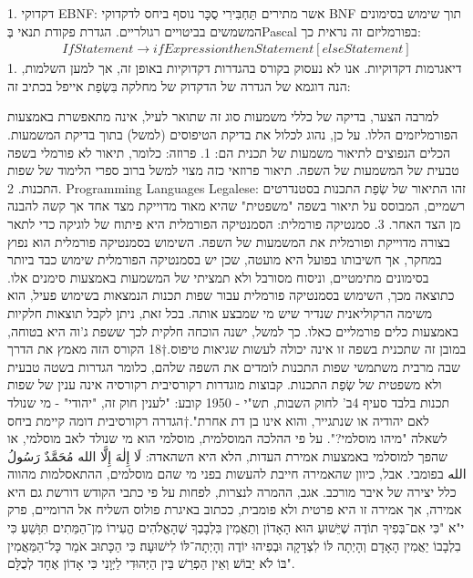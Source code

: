       1. דקדוקי EBNF: אשר מתירים תַּחְבִּירִי סֻכָּר נוסף ביחס לדקדוקי BNF תוך שימוש בסימונים המשמשים בביטויים רגולריים. הגדרת פקודת תנאי בְּPascal בפורמליזם זה נראית כך:
      \begin{align}
      IfStatement → if Expression then Statement [else Statement]
    \end{align}
      1. דיאגרמות דקדוקיות. אנו לא נעסוק בקורס בהגדרות דקדוקיות באופן זה, אך למען השלמות, הנה דוגמא של הגדרה של הדקדוק של מחלקה בִּשְׂפַת אייפל בכתיב זה:

      למרבה הצער, בדיקה של כללי משמעות סוג זה שתואר לעיל, אינה מתאפשרת באמצעות
      הפורמליזמים הללו. על כן, נהוג לכלול את בדיקת הטיפוסים (למשל) בתוך בדיקת
      המשמעות.  הכלים הנפוצים לתיאור משמעות של תכנית הם:
      1. פרוזה: כלומר, תיאור לא פורמלי בשפה טבעית של המשמעות של השפה. תיאור פרוזאי כזה מצוי למשל ברוב ספרי הלימוד של שפות התכנות.
      2. Programming Languages Legalese: זהו התיאור של שְׂפַת התכנות בסטנדרטים רשמיים, המבוסס על תיאור בשפה "משפטית" שהיא מאוד מדוייקת מצד אחד אך קשה להבנה מן הצד האחר.
      3. סמנטיקה פורמלית: הסמנטיקה הפורמלית היא פיתוח של לוגיקה כדי לתאר בצורה מדוייקת ופורמלית את המשמעות של השפה.
      השימוש בסמנטיקה פורמלית הוא נפוץ במחקר, אך חשיבותו בפועל היא מועטה, שכן יש בסמנטיקה הפורמלית שימוש כבד ביותר בסימונים מתימטיים, וניסוח מסורבל ולא תמציתי של המשמעות באמצעות סימנים אלו. כתוצאה מכך, השימוש בסמנטיקה פורמלית עבור שפות תכנות הנמצאות בשימוש פעיל, הוא משימה הרקוליאנית שנדיר שיש מי שמבצע אותה.
      בכל זאת, ניתן לקבל תוצאות חלקיות באמצעות כלים פורמליים כאלו. כך למשל, ישנה הוכחה חלקית לכך ששפת ג'וה היא בטוחה, במובן זה שתכנית בשפה זו אינה יכולה לעשות שגיאות טיפוס.†{18}
      הקורס הזה מאמץ את הדרך שבה מרבית משתמשי שפות התכנות לומדים את השפה שלהם, כלומר
      הגדרות בשטה טבעית ולא משפטית של שְׂפַת התכנות.
      קבוצות מוגדרות רקורסיבית
      רקורסיה אינה ענין של שפות תכנות בלבד
      סעיף 4ב' לחוק השבות, תש"י - 1950 קובע:
      "לענין חוק זה, "יהודי" - מי שנולד לאם יהודיה או שנתגייר, והוא אינו בן דת אחרת".†{הגדרה רקורסיבית דומה קיימת ביחס לשאלה "מיהו מוסלמי?". על פי ההלכה המוסלמית, מוסלמי הוא מי שנולד לאב מוסלמי, או שהפך למוסלמי באמצעות אמירת העדות, הלא היא השהאדה: لَا إِلٰهَ إِلَّا الله مُحَمَّدٌ رَسُولُ الله בפומבי. אבל, כיוון שהאמירה חייבת להעשות בפני מי שהם מוסלמים, ההתאסלמות מהווה כלל יצירה של איבר מורכב. אגב, ההמרה לנצרות, לפחות על פי כתבי הקודש דורשת גם היא אמירה, אך אמירה זו היא פרטית ולא פומבית, ככתוב באיגרת פולוס השליח אל הרומיים, פרק י"א "כִּי אִם־בְּפִיךָ תוֹדֶה שֶׁיֵּשׁוּעַ הוּא הָאָדוֹן וְתַאֲמִין בִּלְבָבְךָ שֶׁהָאֱלֹהִים הֱעִירוֹ מִן־הַמֵּתִים תִּוָּשֵׁעַ׃ כִּי בִלְבָבוֹ יַאֲמִין הָאָדָם וְהָיְתָה לּוֹ לִצְדָקָה וּבְפִיהוּ יוֹדֶה וְהָיְתָה־לּוֹ לִישׁוּעָה׃ כִּי הַכָּתוּב אֹמֵר כָּל־הַמַּאֲמִין בּוֹ לֹא יֵבוֹשׁ׃ וְאֵין הַפְרֵשׁ בֵּין הַיְּהוּדִי לַיְּוָנִי כִּי אָדוֹן אֶחָד לְכֻלָּם".}
